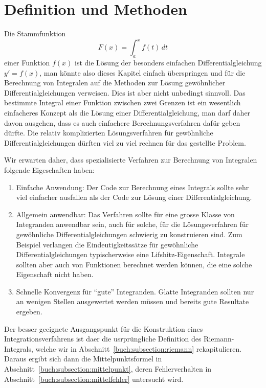%
%
%
\section{Definition und Methoden
\label{buch:section:integraldefinition}}
Die Stammfunktion 
\[
F(x) =  \int_a^x f(t)\,dt
\]
einer Funktion $f(x)$ ist die Lösung der besonders einfachen
Differentialgleichung $y'=f(x)$, man könnte also dieses Kapitel
einfach überspringen und für die Berechnung von Integralen auf
die Methoden zur Lösung gewöhnlicher Differentialgleichungen
verweisen.
Dies ist aber nicht unbedingt sinnvoll.
Das bestimmte Integral einer Funktion zwischen zwei
Grenzen ist ein wesentlich einfacheres Konzept als die Lösung einer
Differentialgleichung, man darf daher davon ausgehen, dass es
auch einfachere Berechnungsverfahren dafür geben dürfte.
Die relativ komplizierten Lösungsverfahren für gewöhnliche
Differentialgleichungen dürften viel zu viel rechnen für das gestellte Problem.

Wir erwarten daher, dass spezialisierte Verfahren zur Berechnung von
Integralen folgende Eigeschaften haben:
\begin{enumerate}
\item Einfache Anwendung: Der Code zur Berechnung eines Integrals
sollte sehr viel einfacher ausfallen als der Code zur Lösung einer
Differentialgleichung.
\item Allgemein anwendbar: Das Verfahren sollte für eine grosse Klasse
von Integranden anwendbar sein, auch für solche, für die Lösungsverfahren
für gewöhnliche Differentialgleichungen schwierig zu konstruieren sind.
Zum Beispiel verlangen die Eindeutigkeitssätze für gewöhnliche
Differentialgleichungen typischerweise eine Lifshitz-Eigenschaft.
Integrale sollten aber auch von Funktionen berechnet werden können, die
eine solche Eigenschaft nicht haben.
\item Schnelle Konvergenz für ``gute'' Integranden.
Glatte Integranden sollten nur an wenigen Stellen ausgewertet werden müssen
und bereits gute Resultate ergeben.
\end{enumerate}
Der besser geeignete Ausgangspunkt für die Konstruktion eines 
Integrationsverfahrens ist daer die usrprüngliche Definition des
Riemann-Integrals, welche wir in Abschnitt~\ref{buch:subsection:riemann}
rekapitulieren.
Daraus ergibt sich dann die Mittelpunktsformel in
Abschnitt~\ref{buch:subsection:mittelpunkt}, deren Fehlerverhalten in
Abschnitt~\ref{buch:subsection:mittelfehler} untersucht wird.

